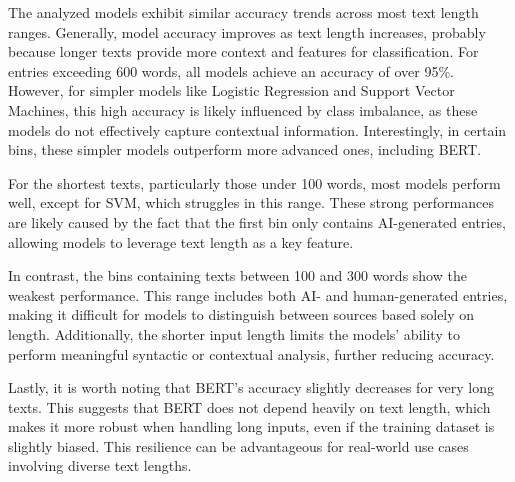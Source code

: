 The analyzed models exhibit similar accuracy trends across most text length ranges. Generally, model accuracy improves as text length increases, probably because longer texts provide more context and features for classification. For entries exceeding 600 words, all models achieve an accuracy of over 95\%. However, for simpler models like Logistic Regression and Support Vector Machines, this high accuracy is likely influenced by class imbalance, as these models do not effectively capture contextual information. Interestingly, in certain bins, these simpler models outperform more advanced ones, including BERT.

\vspace{3mm}

For the shortest texts, particularly those under 100 words, most models perform well, except for SVM, which struggles in this range. These strong performances are likely caused by the fact that the first bin only contains AI-generated entries, allowing models to leverage text length as a key feature.

\vspace{3mm}

In contrast, the bins containing texts between 100 and 300 words show the weakest performance. This range includes both AI- and human-generated entries, making it difficult for models to distinguish between sources based solely on length. Additionally, the shorter input length limits the models' ability to perform meaningful syntactic or contextual analysis, further reducing accuracy.

\vspace{3mm}

Lastly, it is worth noting that BERT's accuracy slightly decreases for very long texts. This suggests that BERT does not depend heavily on text length, which makes it more robust when handling long inputs, even if the training dataset is slightly biased. This resilience can be advantageous for real-world use cases involving diverse text lengths.


